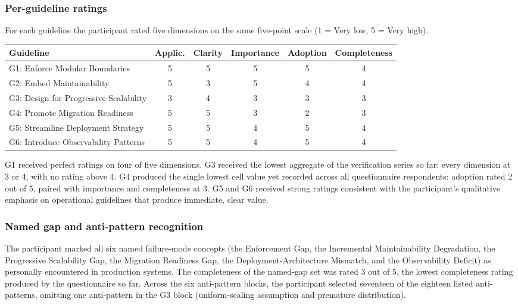 \subsubsection*{Per-guideline ratings}

For each guideline the participant rated five dimensions on the same five-point scale (1 = Very low, 5 = Very high).

\begin{longtable}{p{5cm} c c c c c}
\toprule
\textbf{Guideline} & \textbf{Applic.} & \textbf{Clarity} & \textbf{Importance} & \textbf{Adoption} & \textbf{Completeness} \\
\midrule
\endhead
G1: Enforce Modular Boundaries  & 5 & 5 & 5 & 5 & 4 \\
G2: Embed Maintainability       & 5 & 3 & 5 & 4 & 4 \\
G3: Design for Progressive Scalability & 3 & 4 & 3 & 3 & 3 \\
G4: Promote Migration Readiness & 5 & 5 & 3 & 2 & 3 \\
G5: Streamline Deployment Strategy & 5 & 5 & 4 & 5 & 4 \\
G6: Introduce Observability Patterns & 5 & 5 & 4 & 5 & 4 \\
\bottomrule
\end{longtable}

G1 received perfect ratings on four of five dimensions. G3 received the lowest aggregate of the verification series so far: every dimension at 3 or 4, with no rating above 4. G4 produced the single lowest cell value yet recorded across all questionnaire respondents: adoption rated 2 out of 5, paired with importance and completeness at 3. G5 and G6 received strong ratings consistent with the participant's qualitative emphasis on operational guidelines that produce immediate, clear value.

\subsubsection*{Named gap and anti-pattern recognition}

The participant marked all six named failure-mode concepts (the Enforcement Gap, the Incremental Maintainability Degradation, the Progressive Scalability Gap, the Migration Readiness Gap, the Deployment-Architecture Mismatch, and the Observability Deficit) as personally encountered in production systems. The completeness of the named-gap set was rated 3 out of 5, the lowest completeness rating produced by the questionnaire so far. Across the six anti-pattern blocks, the participant selected seventeen of the eighteen listed anti-patterns, omitting one anti-pattern in the G3 block (uniform-scaling assumption and premature distribution).

